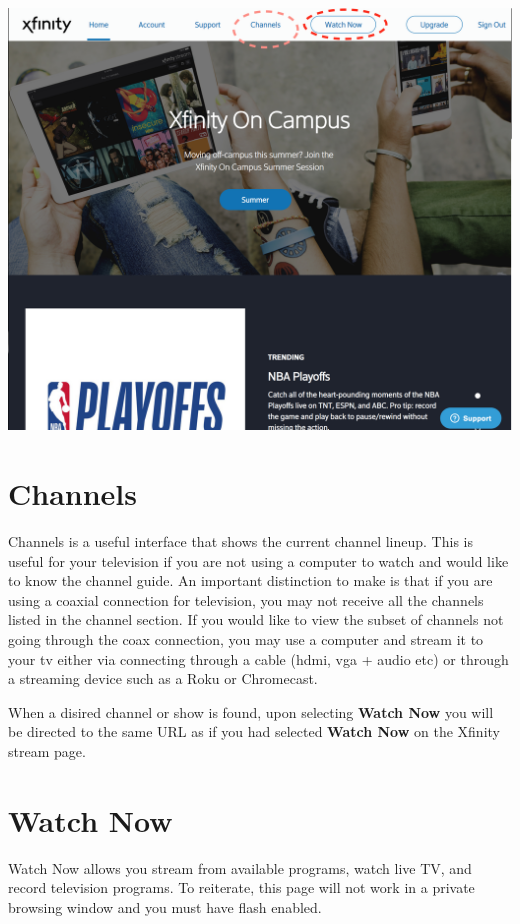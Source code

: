 \documentclass[a4paper, 11pt]{article}
\begin{document}
\includegraphics[width=\linewidth, keepaspectratio]{home.png}
\section*{
  Channels 
}

Channels is a useful interface that shows the current channel lineup.  This 
is useful for your television if you are not using a computer to watch and
would like to know the channel guide.  An important distinction to make is 
that if you are using a coaxial connection for television, you may not
receive all the channels listed in the channel section.  If you would like to
view the subset of channels not going through the coax connection, you may
use a computer and stream it to your tv either via connecting through a 
cable (hdmi, vga + audio etc) or through a streaming device such as a Roku
or Chromecast.

When a disired channel or show is found, upon selecting \textbf{Watch Now} you
will be directed to the same URL as if you had selected \textbf{Watch Now} on
the Xfinity stream page.

\section*{
  Watch Now
}

Watch Now allows you stream from available programs, watch live TV, and record television programs.  To reiterate, this page will not work in a private 
browsing window and you must have flash enabled.  
\end{document}

